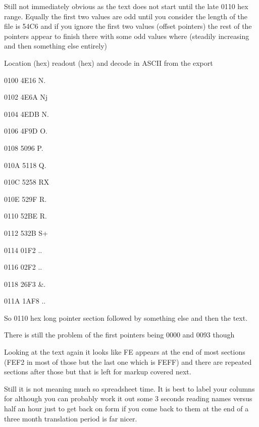 \documentclass[
]{book}
\begin{document}
Still not immediately obvious as the text does not start until the late 0110 hex range. Equally the first two values are odd until you consider the length of the file is 54C6 and if you ignore the first two values (offset pointers) the rest of the pointers appear to finish there with some odd values where (steadily increasing and then something else entirely)

Location (hex) readout (hex) and decode in ASCII from the export

0100 4E16 N.

0102 4E6A Nj

0104 4EDB N.

0106 4F9D O.

0108 5096 P.

010A 5118 Q.

010C 5258 RX

010E 529F R.

0110 52BE R.

0112 532B S+

0114 01F2 ..

0116 02F2 ..

0118 26F3 \&.

011A 1AF8 ..

So 0110 hex long pointer section followed by something else and then the text.

There is still the problem of the first pointers being 0000 and 0093 though

Looking at the text again it looks like FE appears at the end of most sections (FEF2 in most of those but the last one which is FEFF) and there are repeated sections after those but that is left for markup covered next.

Still it is not meaning much so spreadsheet time. It is best to label your columns for although you can probably work it out some 3 seconds reading names versus half an hour just to get back on form if you come back to them at the end of a three month translation period is far nicer.
\end{document}
